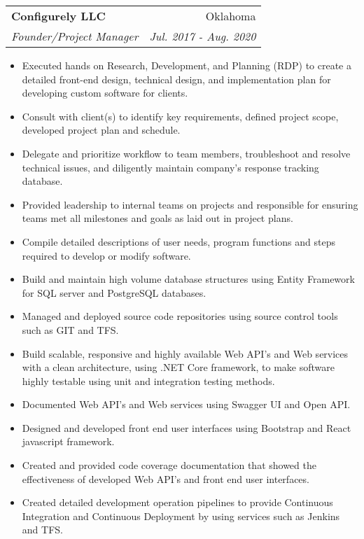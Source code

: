 \documentclass[letterpaper,11pt]{article}
\makeatletter
\newcommand{\resumeItem}[2]{
  \item\small{
    \textbf{#1}{#2 \vspace{-2pt}}
  }
}
\newcommand{\resumeSubheading}[4]{
  \vspace{-1pt}\item
    \begin{tabular*}{0.97\textwidth}[t]{l@{\extracolsep{\fill}}r}
      \textbf{#1} & #2 \\
      \textit{\small#3} & \textit{\small #4} \\
    \end{tabular*}\vspace{-5pt}
}
\newcommand{\resumeItemListStart}{\begin{itemize}}
\newcommand{\resumeItemListEnd}{\end{itemize}\vspace{-5pt}}
\makeatother
\begin{document}
    \resumeSubheading
      {Configurely LLC}{Oklahoma}
      {Founder/Project Manager}{Jul. 2017 - Aug. 2020}
      \resumeItemListStart
        \resumeItem{}
          {Executed hands on Research, Development, and Planning (RDP) to create a detailed front-end design, technical design, and implementation plan for developing custom software for clients.}
        \resumeItem{}
          {Consult with client(s) to identify key requirements, defined project scope, developed project plan and schedule.}
        \resumeItem{}
          {Delegate and prioritize workflow to team members, troubleshoot and resolve technical issues, and diligently maintain company’s response tracking database. }
        \resumeItem{}
          {Provided leadership to internal teams on projects and responsible for ensuring teams met all milestones and goals as laid out in project plans.}
        \resumeItem{}
          {Compile detailed descriptions of user needs, program functions and steps required to develop or modify software.}
        \resumeItem{}
          {Build and maintain high volume database structures using Entity Framework for SQL server and PostgreSQL databases.}
        \resumeItem{}
          {Managed and deployed source code repositories using source control tools such as GIT and TFS.}
        \resumeItem{}
          {Build scalable, responsive and highly available Web API's and Web services with a clean architecture, using .NET Core framework, to make software highly testable using unit and integration testing methods.}
        \resumeItem{}
          {Documented Web API's and Web services using Swagger UI and Open API.}
        \resumeItem{}
          {Designed and developed front end user interfaces using Bootstrap and React javascript framework.}
        \resumeItem{}
          {Created and provided code coverage documentation that showed the effectiveness of developed Web API's and front end user interfaces.}
        \resumeItem{}
          {Created detailed development operation pipelines to provide Continuous Integration and Continuous Deployment by using services such as Jenkins and TFS.}
      \resumeItemListEnd
\end{document}
